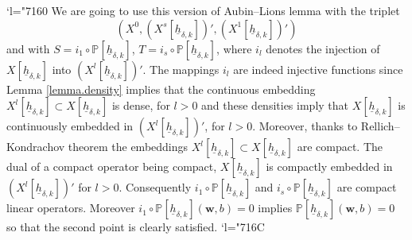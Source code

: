 \documentclass[JEP,XML,SOM,Unicode,NoFloatCountersInSection]{cedram}
\newcommand{\Changel}{\mathcode`l="7160}
\newcommand{\Changelback}{\mathcode`l="716C}
\theoremstyle{remark}
\theoremstyle{definition}
\newcommand{\wg}{\boldsymbol{w}}
\newcommand{\hb}{{\underline{h}}}
\begin{document}
\Changel
We are going to use this version of Aubin--Lions lemma with the triplet
\[
(X^0,(X^{s}[\hb_{\delta, k}])',(X^{1}[\hb_{\delta, k}])')
\]
and with $S= i_1\circ \mathbb{P}[\hb_{\delta, k}]$, $T=i_s\circ \mathbb{P}[\hb_{\delta, k}]$, where $i_l$ denotes the injection of $X[\hb_{\delta, k}]$ into $(X^{l}[\hb_{\delta, k}])'$. The mappings $i_l$ are indeed injective functions since Lemma \ref{lemma.density} implies that the continuous embedding $X^l[\hb_{\delta,k}] \subset X[\hb_{\delta, k}]$ is dense, for $l>0$ and these densities imply that $X[\hb_{\delta, k}]$ is continuously embedded in $(X^{l}[\hb_{\delta, k}])'$, for $l>0$. Moreover, thanks to Rellich--Kondrachov theorem the embeddings $X^l[\hb_{\delta,k}] \subset X[\hb_{\delta, k}]$ are compact. The dual of a compact operator being compact, $X[\hb_{\delta, k}] $ is compactly embedded in $(X^{l}[\hb_{\delta, k}])'$ for $l>0$. Consequently $i_1\circ \mathbb{P}[\hb_{\delta, k}]$ and $i_s\circ \mathbb{P}[\hb_{\delta, k}]$ are compact linear operators. Moreover $i_1\circ \mathbb{P}[\hb_{\delta, k}](\wg, b)=0$ implies $\mathbb{P}[\hb_{\delta, k}](\wg, b)=0$ so that the second point is clearly satisfied.
\Changelback
\end{document}
